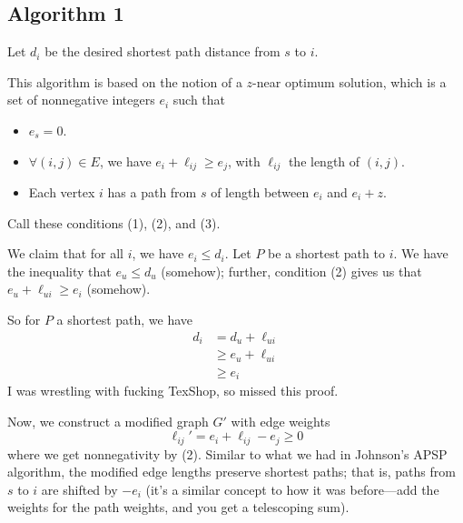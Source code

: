 \documentclass{article}
\begin{document}
\subsection{Algorithm 1}

Let $d_i$ be the desired shortest path distance from $s$ to $i$.

This algorithm is based on the notion of a $z$-near optimum solution,
which is a set of nonnegative integers $e_i$ such that


\begin{itemize}
	\item
	$e_{s} = 0$.
	
	\item
	$\forall(i,j) \in E$, we have $e_i + \ell_{ij} \geq e_j$, with 
	$\ell_{ij}$ the length of $(i,j)$.
	
	\item
	Each vertex $i$ has a path from $s$ of length between $e_i$ and $e_i + z$.
\end{itemize}
Call these conditions (1), (2), and (3).

We claim that for all $i$, we have $e_i \leq d_i$.
Let $P$ be a shortest path to $i$.
We have the inequality that $e_u \leq d_u$ (somehow); further, 
condition (2) gives us that $e_u + \ell_{ui} \geq e_i$ (somehow).

So for $P$ a shortest path, we have
\begin{align}
d_i
&=
d_u + \ell_{ui}
\\
& \geq
e_u + \ell_{ui} \\
& \geq
e_{i}
\end{align}
I was wrestling with fucking TexShop, so missed this proof.

Now, we construct a modified graph $G'$ with edge weights
$$
\ell_{ij}' = e_i + \ell_{ij} - e_j \geq 0
$$
where we get nonnegativity by (2).
Similar to what we had in Johnson's APSP algorithm, the modified edge
lengths preserve shortest paths; that is, paths from $s$ to $i$ are shifted
by $-e_i$ (it's a similar concept to how it was before---add the weights for 
the path weights,
and you get a telescoping sum).
\end{document}
